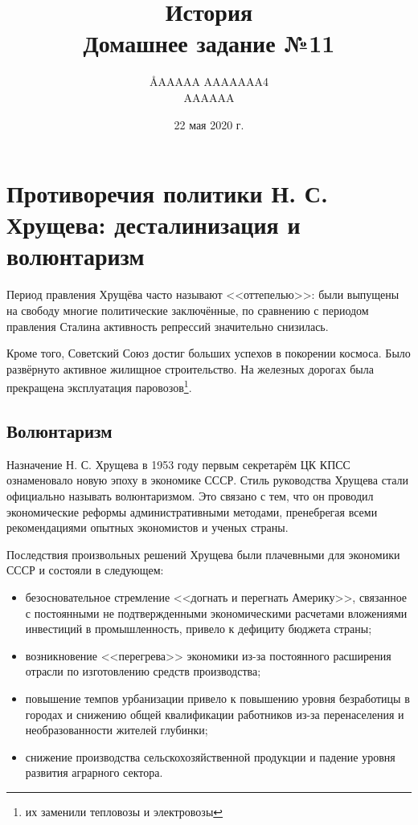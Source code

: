 \documentclass[12pt]{article}
\title{История \\ Домашнее задание №11}
\author{\AA{AAAAA AAAAAAA}{4} \\ AAAAAA}
\date{22 мая 2020 г.}
\begin{document}
  \maketitle

  \section{Противоречия политики Н. С. Хрущева: десталинизация и волюнтаризм}
  Период правления Хрущёва часто называют <<оттепелью>>: были выпущены на свободу многие политические заключённые,
  по сравнению с периодом правления Сталина активность репрессий значительно снизилась.

  Кроме того, Советский Союз достиг больших успехов в покорении космоса.
  Было развёрнуто активное жилищное строительство.
  На железных дорогах была прекращена эксплуатация паровозов\footnote{их заменили тепловозы и электровозы}.

  \subsection{Волюнтаризм}
  Назначение Н. С. Хрущева в 1953 году первым секретарём ЦК КПСС ознаменовало новую эпоху в экономике СССР.
  Стиль руководства Хрущева стали официально называть волюнтаризмом.
  Это связано с тем, что он проводил экономические реформы административными методами,
  пренебрегая всеми рекомендациями опытных экономистов и ученых страны.

  Последствия произвольных решений Хрущева были плачевными для экономики СССР и состояли в следующем:
  \begin{itemize}
    \item безосновательное стремление <<догнать и перегнать Америку>>, связанное с постоянными не подтвержденными экономическими расчетами вложениями инвестиций в промышленность, привело к дефициту бюджета страны;
    \item возникновение <<перегрева>> экономики из-за постоянного расширения отрасли по изготовлению средств производства;
    \item повышение темпов урбанизации привело к повышению уровня безработицы в городах и снижению общей квалификации работников из-за перенаселения и необразованности жителей глубинки;
    \item снижение производства сельскохозяйственной продукции и падение уровня развития аграрного сектора.
  \end{itemize}
\end{document}
